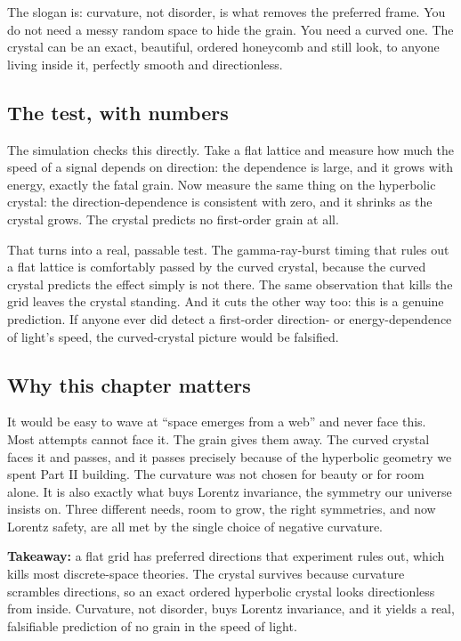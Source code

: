 The slogan is: curvature, not disorder, is what removes the preferred frame. You do not need a messy random space to hide the grain. You need a curved one. The crystal can be an exact, beautiful, ordered honeycomb and still look, to anyone living inside it, perfectly smooth and directionless.

\subsection{The test, with numbers}

The simulation checks this directly. Take a flat lattice and measure how much the speed of a signal depends on direction: the dependence is large, and it grows with energy, exactly the fatal grain. Now measure the same thing on the hyperbolic crystal: the direction-dependence is consistent with zero, and it shrinks as the crystal grows. The crystal predicts no first-order grain at all.

That turns into a real, passable test. The gamma-ray-burst timing that rules out a flat lattice is comfortably passed by the curved crystal, because the curved crystal predicts the effect simply is not there. The same observation that kills the grid leaves the crystal standing. And it cuts the other way too: this is a genuine prediction. If anyone ever did detect a first-order direction- or energy-dependence of light's speed, the curved-crystal picture would be falsified.

\subsection{Why this chapter matters}

It would be easy to wave at ``space emerges from a web'' and never face this. Most attempts cannot face it. The grain gives them away. The curved crystal faces it and passes, and it passes precisely because of the hyperbolic geometry we spent Part II building. The curvature was not chosen for beauty or for room alone. It is also exactly what buys Lorentz invariance, the symmetry our universe insists on. Three different needs, room to grow, the right symmetries, and now Lorentz safety, are all met by the single choice of negative curvature.

\textbf{Takeaway:} a flat grid has preferred directions that experiment rules out, which kills most discrete-space theories. The crystal survives because curvature scrambles directions, so an exact ordered hyperbolic crystal looks directionless from inside. Curvature, not disorder, buys Lorentz invariance, and it yields a real, falsifiable prediction of no grain in the speed of light.
